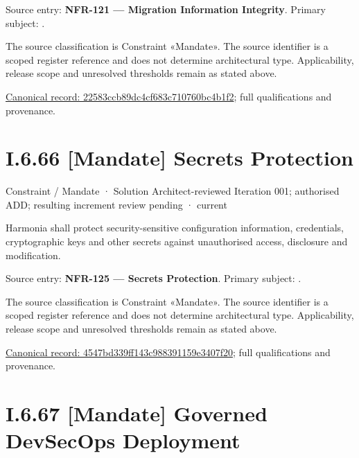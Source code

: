 Source entry: \textbf{NFR-121 — Migration Information Integrity}. Primary subject: \texttt{}.



The source classification is Constraint «Mandate». The source identifier is a scoped register reference and does not determine architectural type. Applicability, release scope and unresolved thresholds remain as stated above.


{\footnotesize \href{../../../../../../../continuum/motivation/constraint/mandate/22583ccb89dc4cf683c710760bc4b1f2.md}{Canonical record: 22583ccb89dc4cf683c710760bc4b1f2}; full qualifications and provenance.}\par
\section*{I.6.66 [Mandate] Secrets Protection}
\label{navigation:I.6.66}

\label{element:4547bd339ff143c988391159e3407f20}
{\small Constraint / Mandate · Solution Architect-reviewed Iteration 001; authorised ADD; resulting increment review pending · current}\par

Harmonia shall protect security-sensitive configuration information, credentials, cryptographic keys and other secrets against unauthorised access, disclosure and modification.



Source entry: \textbf{NFR-125 — Secrets Protection}. Primary subject: \texttt{}.



The source classification is Constraint «Mandate». The source identifier is a scoped register reference and does not determine architectural type. Applicability, release scope and unresolved thresholds remain as stated above.


{\footnotesize \href{../../../../../../../continuum/motivation/constraint/mandate/4547bd339ff143c988391159e3407f20.md}{Canonical record: 4547bd339ff143c988391159e3407f20}; full qualifications and provenance.}\par
\section*{I.6.67 [Mandate] Governed DevSecOps Deployment}
\label{navigation:I.6.67}


